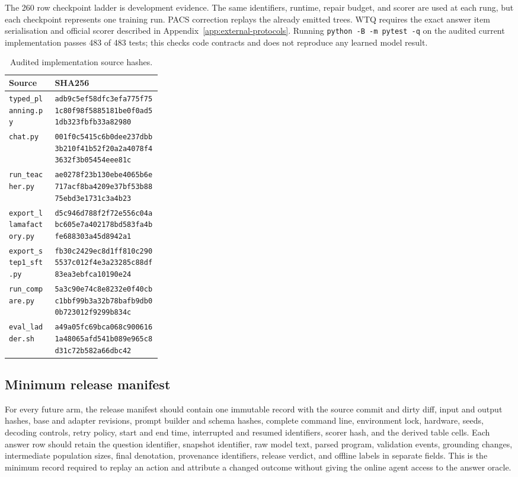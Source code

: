 \documentclass{article}
\begin{document}
The 260 row checkpoint ladder is development evidence.  The same identifiers, runtime, repair
budget, and scorer are used at each rung, but each checkpoint represents one training run.  PACS
correction replays the already emitted trees.  WTQ requires the exact answer item serialisation and
official scorer described in Appendix~\ref{app:external-protocols}.  Running
\texttt{python -B -m pytest -q} on the audited current implementation passes 483 of 483 tests; this
checks code contracts and does not reproduce any learned model result.

\begin{table}[h]
  \centering
  \caption{Audited implementation source hashes.}
  \label{tab:source-hashes}
  \scriptsize
  \begin{tabularx}{\linewidth}{p{0.30\linewidth}X}
    \toprule
    Source & SHA256 \\
    \midrule
    \texttt{typed\_planning.py} & \nolinkurl{adb9c5ef58dfc3efa775f751c80f98f5885181be0f0ad51db323fbfb33a82980} \\
    \texttt{chat.py} & \nolinkurl{001f0c5415c6b0dee237dbb3b210f41b52f20a2a4078f43632f3b05454eee81c} \\
    \texttt{run\_teacher.py} & \nolinkurl{ae0278f23b130ebe4065b6e717acf8ba4209e37bf53b8875ebd3e1731c3a4b23} \\
    \texttt{export\_llamafactory.py} & \nolinkurl{d5c946d788f2f72e556c04abc605e7a402178bd583fa4bfe688303a45d8942a1} \\
    \texttt{export\_step1\_sft.py} & \nolinkurl{fb30c2429ec8d1ff810c2905537c012f4e3a23285c88df83ea3ebfca10190e24} \\
    \texttt{run\_compare.py} & \nolinkurl{5a3c90e74c8e8232e0f40cbc1bbf99b3a32b78bafb9db00b723012f9299b834c} \\
    \texttt{eval\_ladder.sh} & \nolinkurl{a49a05fc69bca068c9006161a48065afd541b089e965c8d31c72b582a66dbc42} \\
    \bottomrule
  \end{tabularx}
\end{table}

\subsection{Minimum release manifest}

For every future arm, the release manifest should contain one immutable record with the source
commit and dirty diff, input and output hashes, base and adapter revisions, prompt builder and schema
hashes, complete command line, environment lock, hardware, seeds, decoding controls, retry policy,
start and end time, interrupted and resumed identifiers, scorer hash, and the derived table cells.
Each answer row should retain the question identifier, snapshot identifier, raw model text, parsed
program, validation events, grounding changes, intermediate population sizes, final denotation,
provenance identifiers, release verdict, and offline labels in separate fields.  This is the minimum
record required to replay an action and attribute a changed outcome without giving the online agent
access to the answer oracle.
\end{document}
